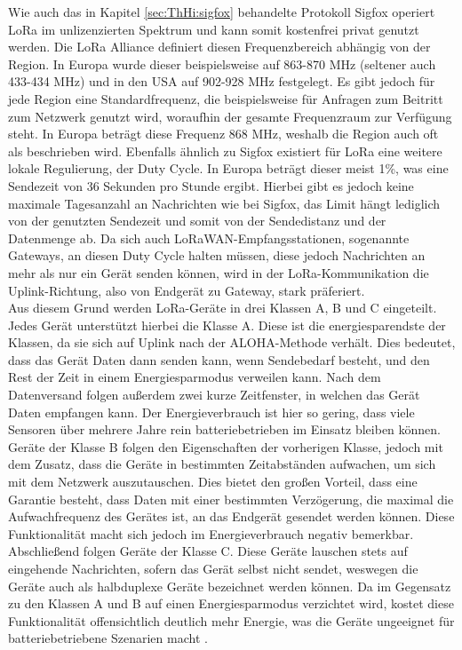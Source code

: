 Wie auch das in Kapitel \ref{sec:ThHi:sigfox} behandelte Protokoll Sigfox operiert LoRa im unlizenzierten Spektrum und kann somit kostenfrei privat genutzt werden. Die LoRa Alliance definiert diesen Frequenzbereich abhängig von der Region. In Europa wurde dieser beispielsweise auf 863-870 MHz (seltener auch 433-434 MHz) und in den USA auf 902-928 MHz festgelegt. Es gibt jedoch für jede Region eine Standardfrequenz, die beispielsweise für Anfragen zum Beitritt zum Netzwerk genutzt wird, woraufhin der gesamte Frequenzraum zur Verfügung steht. In Europa beträgt diese Frequenz 868 MHz, weshalb die Region auch oft als  beschrieben wird. Ebenfalls ähnlich zu Sigfox existiert für LoRa eine weitere lokale Regulierung, der Duty Cycle. In Europa beträgt dieser meist 1\%, was eine Sendezeit von 36 Sekunden pro Stunde ergibt. Hierbei gibt es jedoch keine maximale Tagesanzahl an Nachrichten wie bei Sigfox, das Limit hängt lediglich von der genutzten Sendezeit und somit von der Sendedistanz und der Datenmenge ab. Da sich auch LoRaWAN-Empfangsstationen, sogenannte Gateways, an diesen Duty Cycle halten müssen, diese jedoch Nachrichten an mehr als nur ein Gerät senden können, wird in der LoRa-Kommunikation die Uplink-Richtung, also von Endgerät zu Gateway, stark präferiert. \\
Aus diesem Grund werden LoRa-Geräte in drei Klassen A, B und C eingeteilt. Jedes Gerät unterstützt hierbei die Klasse A. Diese ist die energiesparendste der Klassen, da sie sich auf Uplink nach der ALOHA-Methode verhält. Dies bedeutet, dass das Gerät Daten dann senden kann, wenn Sendebedarf besteht, und den Rest der Zeit in einem Energiesparmodus verweilen kann. Nach dem Datenversand folgen außerdem zwei kurze Zeitfenster, in welchen das Gerät Daten empfangen kann. Der Energieverbrauch ist hier so gering, dass viele Sensoren über mehrere Jahre rein batteriebetrieben im Einsatz bleiben können. Geräte der Klasse B folgen den Eigenschaften der vorherigen Klasse, jedoch mit dem Zusatz, dass die Geräte in bestimmten Zeitabständen aufwachen, um sich mit dem Netzwerk auszutauschen. Dies bietet den großen Vorteil, dass eine Garantie besteht, dass Daten mit einer bestimmten Verzögerung, die maximal die Aufwachfrequenz des Gerätes ist, an das Endgerät gesendet werden können. Diese Funktionalität macht sich jedoch im Energieverbrauch negativ bemerkbar. Abschließend folgen Geräte der Klasse C. Diese Geräte lauschen stets auf eingehende Nachrichten, sofern das Gerät selbst nicht sendet, weswegen die Geräte auch als halbduplexe Geräte bezeichnet werden können. Da im Gegensatz zu den Klassen A und B auf einen Energiesparmodus verzichtet wird, kostet diese Funktionalität offensichtlich deutlich mehr Energie, was die Geräte ungeeignet für batteriebetriebene Szenarien macht . 

